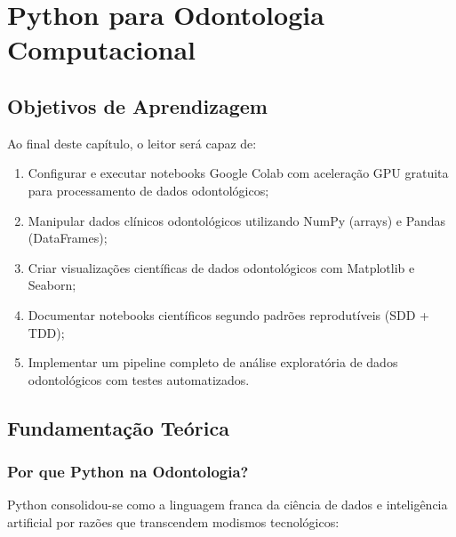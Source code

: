 
\chapter{Python para Odontologia Computacional}
\label{cap:python-colab}

\nivelzero

\section{Objetivos de Aprendizagem}

Ao final deste capítulo, o leitor será capaz de:
\begin{enumerate}
    \item Configurar e executar notebooks Google Colab com aceleração GPU gratuita para processamento de dados odontológicos;
    \item Manipular dados clínicos odontológicos utilizando NumPy (arrays) e Pandas (DataFrames);
    \item Criar visualizações científicas de dados odontológicos com Matplotlib e Seaborn;
    \item Documentar notebooks científicos segundo padrões reprodutíveis (SDD + TDD);
    \item Implementar um pipeline completo de análise exploratória de dados odontológicos com testes automatizados.
\end{enumerate}

\section{Fundamentação Teórica}

\subsection{Por que Python na Odontologia?}

Python  consolidou-se como a linguagem franca da ciência de dados e inteligência artificial por razões que transcendem modismos tecnológicos:

